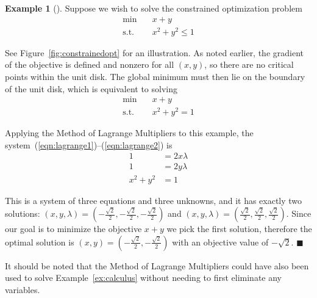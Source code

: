 \documentclass[11pt]{article}
\theoremstyle{definition} %
\newtheorem{ex}{Example}[section] %
\newenvironment{example}[1][]{\begin{ex}[#1]}{\hfill$\blacksquare$\end{ex}} %
\begin{document}
\begin{example}
\label{ex:lagrange}
	Suppose we wish to solve the constrained optimization problem
	\begin{align*}
		\min \quad& x + y \\
		\mathrm{s.t.} \quad& x^2 + y^2 \le 1
	\end{align*}
	
	See Figure~\ref{fig:constrainedopt} for an illustration. As noted earlier, the gradient of the objective is defined and nonzero for all $(x,y)$, so there are no critical points within the unit disk. The global minimum must then lie on the boundary of the unit disk, which is equivalent to solving
	\begin{align*}
		\min \quad& x + y \\
		\mathrm{s.t.} \quad& x^2 + y^2 = 1
	\end{align*}
	
	Applying the Method of Lagrange Multipliers to this example, the system~(\ref{eqn:lagrange1})--(\ref{eqn:lagrange2}) is
	\begin{align*}
		1 &= 2x \lambda \\
		1 &= 2y \lambda \\
		x^2 + y^2 &= 1
	\end{align*}
	
	This is a system of three equations and three unknowns, and it has exactly two solutions: $(x,y,\lambda) = (-\frac{\sqrt{2}}{2}, -\frac{\sqrt{2}}{2}, -\frac{\sqrt{2}}{2})$ and $(x,y,\lambda) = (\frac{\sqrt{2}}{2}, \frac{\sqrt{2}}{2}, \frac{\sqrt{2}}{2})$. Since our goal is to minimize the objective $x+y$ we pick the first solution, therefore the optimal solution is $(x,y) = (-\frac{\sqrt{2}}{2}, -\frac{\sqrt{2}}{2})$ with an objective value of $-\sqrt{2}$.
\end{example}

It should be noted that the Method of Lagrange Multipliers could have also been used to solve Example~\ref{ex:calculus} without needing to first eliminate any variables.
\end{document}
